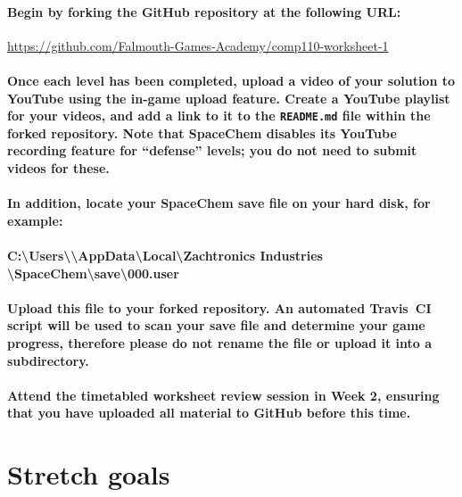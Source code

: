 \documentclass{../../../fal_assignment}
\begin{document}
\paragraph{
Begin by \textbf{forking} the GitHub repository at the following URL:
}

\url{https://github.com/Falmouth-Games-Academy/comp110-worksheet-1}

\paragraph{
Once each level has been completed, upload a \textbf{video} of your solution to YouTube using the in-game upload feature.
Create a YouTube playlist for your videos, and add a link to it to the \texttt{README.md} file within the forked repository.
Note that SpaceChem disables its YouTube recording feature for ``defense'' levels; you do \textbf{not} need to submit videos for these.
}

\paragraph{
In addition, locate your SpaceChem save file on your hard disk, for example:
}

\paragraph{
C:\textbackslash Users\textbackslash <your name>\textbackslash AppData\textbackslash Local\textbackslash Zachtronics Industries\\ \textbackslash SpaceChem\textbackslash save\textbackslash 000.user
}

\paragraph{
\textbf{Upload} this file to your forked repository.
An automated Travis~CI script will be used to scan your save file and determine your game progress,
therefore please do \textbf{not} rename the file or upload it into a subdirectory.
}

\paragraph{
Attend the timetabled worksheet review session in \textbf{Week 2},
ensuring that you have uploaded all material to GitHub before this time.
}

\section*{Stretch goals}
\end{document}
